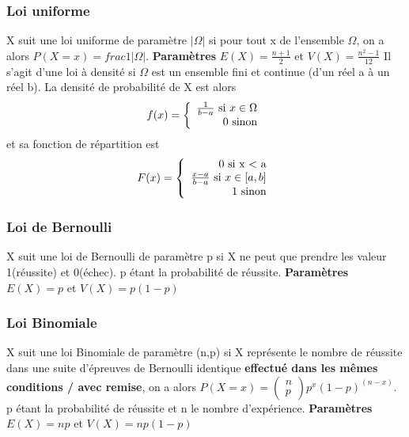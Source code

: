 \documentclass[a4paper]{article}
\begin{document}
\subsubsection{Loi uniforme}
X suit une loi uniforme de paramètre $| \Omega |$ si pour tout x de l'ensemble $\Omega$, on a alors $P(X=x)=frac{1}{|\Omega |}$. \newline
\textbf{Paramètres}
$E(X) = \frac{n+1}{2}$ et $ V(X)=\frac{n^2-1}{12}$ \newline
Il s'agit d'une loi à densité si $\Omega$ est un ensemble fini et continue (d'un réel a à un réel b). La densité de probabilité de X est alors 
\begin{eqnarray}
f(x) = \left \{
\begin{array}{r l l}
\frac{1}{b-a} \text{ si $x \in \Omega$} \\
0 \text{ sinon} \\
\end{array}
\right . 
\end{eqnarray} et sa fonction de répartition est 
\begin{eqnarray}
F(x) = \left \{
\begin{array}{r l l}
0 \text{ si x < a} \\
\frac{x-a}{b-a} \text{ si $x \in [a,b]$} \\
1 \text{ sinon} \\
\end{array}
\right . 
\end{eqnarray}
\subsubsection{Loi de Bernoulli}
X suit une loi de Bernoulli de paramètre p si X ne peut que prendre les valeur 1(réussite) et 0(échec). p étant la probabilité de réussite. \newline
\textbf{Paramètres}
$E(X) = p$ et $ V(X)=p(1-p)$
\subsubsection{Loi Binomiale}
X suit une loi Binomiale de paramètre (n,p) si X représente le nombre de réussite dans une suite d'épreuves de Bernoulli identique \textbf{effectué dans les mêmes conditions / avec remise}, on a alors $P(X=x)=\left( \begin{array}{l} n \\ p \end{array} \right) p^x (1-p)^(n-x)$. p étant la probabilité de réussite et n le nombre d'expérience. \newline
\textbf{Paramètres} 
$E(X) = np$ et $ V(X)=np(1-p)$
\end{document}
